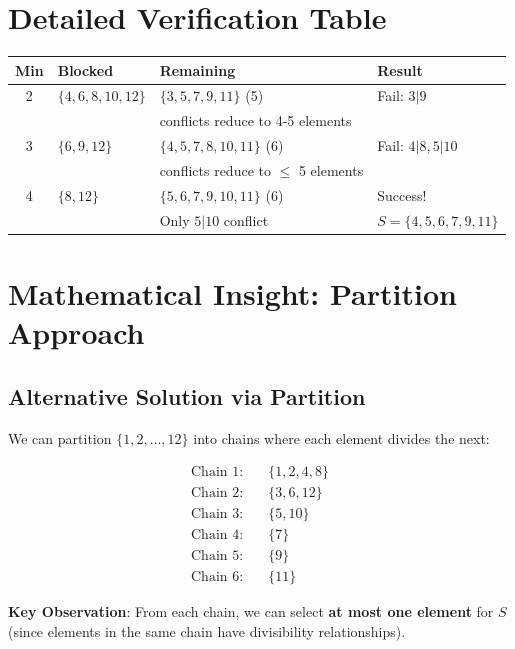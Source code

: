 \documentclass[12pt]{article}
\begin{document}
\section*{Detailed Verification Table}

\begin{center}
\begin{tabular}{|c|l|l|l|}
\hline
\textbf{Min} & \textbf{Blocked} & \textbf{Remaining} & \textbf{Result} \\
\hline
2 & $\{4,6,8,10,12\}$ & $\{3,5,7,9,11\}$ (5) & Fail: $3|9$ \\
& & conflicts reduce to 4-5 elements & \\
\hline
3 & $\{6,9,12\}$ & $\{4,5,7,8,10,11\}$ (6) & Fail: $4|8, 5|10$ \\
& & conflicts reduce to $\leq$ 5 elements & \\
\hline
4 & $\{8,12\}$ & $\{5,6,7,9,10,11\}$ (6) & Success! \\
& & Only $5|10$ conflict & $S = \{4,5,6,7,9,11\}$ \\
\hline
\end{tabular}
\end{center}

\section*{Mathematical Insight: Partition Approach}

\subsection*{Alternative Solution via Partition}

We can partition $\{1,2,\ldots,12\}$ into chains where each element divides the next:

\begin{align*}
\text{Chain 1:} &\quad \{1, 2, 4, 8\} \\
\text{Chain 2:} &\quad \{3, 6, 12\} \\
\text{Chain 3:} &\quad \{5, 10\} \\
\text{Chain 4:} &\quad \{7\} \\
\text{Chain 5:} &\quad \{9\} \\
\text{Chain 6:} &\quad \{11\}
\end{align*}

\textbf{Key Observation}: From each chain, we can select \textbf{at most one element} for $S$ (since elements in the same chain have divisibility relationships).
\end{document}
